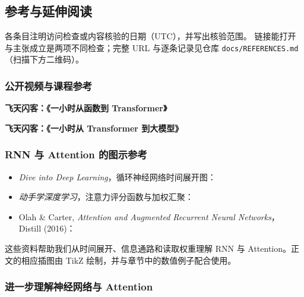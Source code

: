 \subsection{参考与延伸阅读}
各条目注明访问检查或内容核验的日期（UTC），并写出核验范围。
链接能打开与主张成立是两项不同检查；完整 URL 与逐条记录见仓库
\texttt{docs/REFERENCES.md}（扫描下方二维码）。
\sourceqr

\subsubsection*{公开视频与课程参考}

\textbf{飞天闪客：《一小时从函数到 Transformer》}

\textbf{飞天闪客：《一小时从 Transformer 到大模型》}


\subsubsection*{RNN 与 Attention 的图示参考}
\begin{itemize}
\item \emph{Dive into Deep Learning}，循环神经网络时间展开图：
\item \emph{动手学深度学习}，注意力评分函数与加权汇聚：
\item Olah \& Carter, \emph{Attention and Augmented Recurrent Neural Networks}，
Distill (2016)：
\end{itemize}

这些资料帮助我们从时间展开、信息通路和读取权重理解 RNN 与 Attention。正文的相应插图由 TikZ 绘制，并与章节中的数值例子配合使用。

\subsubsection*{进一步理解神经网络与 Attention}

